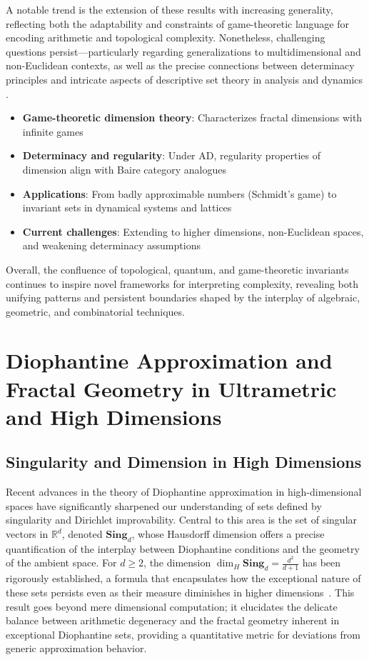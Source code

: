 \documentclass[sigconf]{acmart}
\begin{document}
A notable trend is the extension of these results with increasing generality, reflecting both the adaptability and constraints of game-theoretic language for encoding arithmetic and topological complexity. Nonetheless, challenging questions persist—particularly regarding generalizations to multidimensional and non-Euclidean contexts, as well as the precise connections between determinacy principles and intricate aspects of descriptive set theory in analysis and dynamics \cite{ref80}.

\begin{itemize}
    \item \textbf{Game-theoretic dimension theory}: Characterizes fractal dimensions with infinite games
    \item \textbf{Determinacy and regularity}: Under AD, regularity properties of dimension align with Baire category analogues
    \item \textbf{Applications}: From badly approximable numbers (Schmidt's game) to invariant sets in dynamical systems and lattices
    \item \textbf{Current challenges}: Extending to higher dimensions, non-Euclidean spaces, and weakening determinacy assumptions
\end{itemize}

Overall, the confluence of topological, quantum, and game-theoretic invariants continues to inspire novel frameworks for interpreting complexity, revealing both unifying patterns and persistent boundaries shaped by the interplay of algebraic, geometric, and combinatorial techniques.

\section{Diophantine Approximation and Fractal Geometry in Ultrametric and High Dimensions}

\subsection{Singularity and Dimension in High Dimensions}

Recent advances in the theory of Diophantine approximation in high-dimensional spaces have significantly sharpened our understanding of sets defined by singularity and Dirichlet improvability. Central to this area is the set of singular vectors in $\mathbb{R}^d$, denoted $\mathbf{Sing}_d$, whose Hausdorff dimension offers a precise quantification of the interplay between Diophantine conditions and the geometry of the ambient space. For $d \geq 2$, the dimension $\dim_H \mathbf{Sing}_d = \frac{d^2}{d+1}$ has been rigorously established, a formula that encapsulates how the exceptional nature of these sets persists even as their measure diminishes in higher dimensions~\cite{ref109}. This result goes beyond mere dimensional computation; it elucidates the delicate balance between arithmetic degeneracy and the fractal geometry inherent in exceptional Diophantine sets, providing a quantitative metric for deviations from generic approximation behavior.
\end{document}
